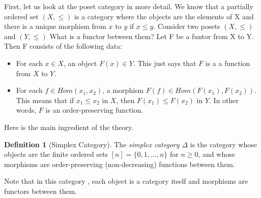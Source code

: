 \documentclass[11pt]{article}
\theoremstyle{definition}
\newtheorem{definition}{Definition}[section]
\theoremstyle{plain}
\begin{document}
First, let us look at the poset category in more detail.
We know that a partially ordered set $(X,\leq)$ is a category where the objects are the elements of X and there is a unique morphism from $x$ to $y$ if $x \leq y$.
Consider two posets $(X,\leq)$ and $(Y,\leq)$  What is a functor between them?
Let F be a funtor from X to Y.
Then F consists of the following data:
\begin{itemize}
    \item For each $x \in X$, an object $F(x) \in Y$. This just says that $F$ is a a function from $X$ to $Y$.
    \item For each $f \in Hom(x_1,x_2)$, a morphism $F(f) \in Hom(F(x_1),F(x_2))$.
          This means that if $x_1 \leq x_2$ in $X$, then $F(x_1) \leq F(x_2)$ in $Y$. In other words, $F$ is an order-preserving function.
\end{itemize}


Here is the main ingredient of the theory.
\begin{definition}[Simplex Category]
    The \emph{simplex category} $\Delta$ is the category whose objects are the finite ordered sets $[n] = \{0,1,\dots,n\}$ for $n \geq 0$, and whose morphisms are order-preserving (non-decreasing) functions between them.
\end{definition}

Note that in this category , each object is a category itself and morphisms are functors between them.
\end{document}
